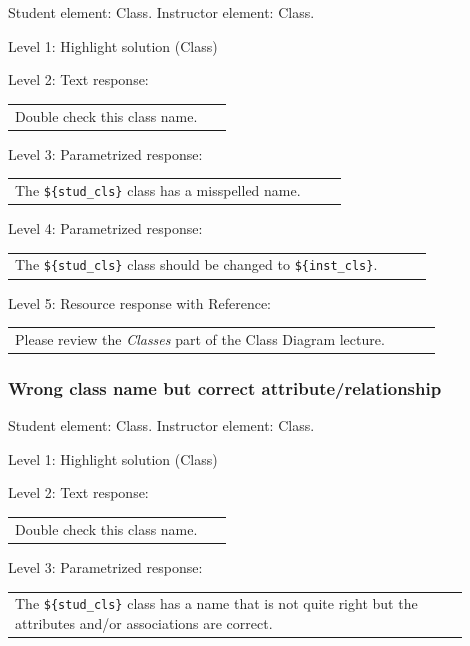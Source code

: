 Student element: Class. Instructor element: Class. \medskip

\noindent Level 1: Highlight solution (Class) \medskip

\noindent Level 2: Text response: \medskip

\begin{tabular}{|p{0.9\linewidth}}
Double check this class name.
\end{tabular} \medskip

\noindent Level 3: Parametrized response: \medskip

\begin{tabular}{|p{0.9\linewidth}}
The \verb|${stud_cls}| class has a misspelled name.
\end{tabular} \medskip

\noindent Level 4: Parametrized response: \medskip

\begin{tabular}{|p{0.9\linewidth}}
The \verb|${stud_cls}| class should be changed to \verb|${inst_cls}|.
\end{tabular} \medskip

\noindent Level 5: Resource response with Reference: \medskip

\begin{tabular}{|p{0.9\linewidth}}
Please review the \textit{Classes} part of the Class Diagram lecture.
\end{tabular} \medskip


\subsubsection{Wrong class name but correct attribute/relationship}

Student element: Class. Instructor element: Class. \medskip

\noindent Level 1: Highlight solution (Class) \medskip

\noindent Level 2: Text response: \medskip

\begin{tabular}{|p{0.9\linewidth}}
Double check this class name.
\end{tabular} \medskip

\noindent Level 3: Parametrized response: \medskip

\begin{tabular}{|p{0.9\linewidth}}
The \verb|${stud_cls}| class has a name that is not quite right but the attributes and/or associations are correct.
\end{tabular} \medskip

